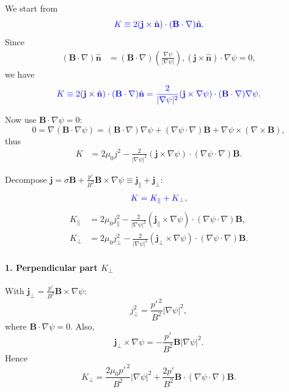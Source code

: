 \documentclass[10pt,a4paper]{article}
\numberwithin{equation}{section}
\begin{document}
We start from
\begin{equation}
\color{blue} K \equiv 2(\mathbf j\times \hat{\mathbf n})\cdot(\mathbf B\cdot\nabla)\hat{\mathbf n}.
\end{equation}
Since
\color{blue}\begin{align}
(\mathbf B\cdot\nabla)\hat{\mathbf n} &= (\mathbf B\cdot\nabla)\left(\frac{\nabla\psi}{|\nabla\psi|}\right),
(\mathbf j\times \hat{\mathbf n})\cdot \nabla\psi = 0,
\end{align}
\color{black}
we have
\begin{equation}
\color{blue}K
\equiv 2(\mathbf j\times \hat{\mathbf n})\cdot(\mathbf B\cdot\nabla)\hat{\mathbf n}
=
\frac{2}{|\nabla\psi|^2}
(\mathbf j\times\nabla\psi)\cdot(\mathbf B\cdot\nabla)\nabla\psi.
\end{equation}

Now use $\mathbf B\cdot\nabla\psi=0$:
\begin{equation}
0=\nabla(\mathbf B\cdot\nabla\psi) = (\mathbf B\cdot\nabla)\nabla\psi + (\nabla\psi\cdot\nabla)\mathbf B + \nabla\psi\times(\nabla\times\mathbf B),
\end{equation}
thus
\color{blue}\begin{align}
K &= 2\mu_0 j^2 - \frac{2}{|\nabla\psi|^2}(\mathbf j\times\nabla\psi)\cdot(\nabla\psi\cdot\nabla)\mathbf B.
\end{align}
\color{black}

Decompose $\mathbf j = \sigma\mathbf B + \frac{p'}{B^2}\mathbf B\times\nabla\psi \equiv \mathbf j_{\parallel}+\mathbf j_{\perp}$:
\begin{equation}
\color{blue}K = K_{\parallel}+K_{\perp},
\end{equation}
\color{blue}\begin{align}
K_{\parallel}
&=
2\mu_0 j_{\parallel}^2
-\frac{2}{|\nabla\psi|^2}
(\mathbf j_{\parallel}\times\nabla\psi)\cdot(\nabla\psi\cdot\nabla)\mathbf B,
\\
K_{\perp}
&=
2\mu_0 j_{\perp}^2
-\frac{2}{|\nabla\psi|^2}
(\mathbf j_{\perp}\times\nabla\psi)\cdot(\nabla\psi\cdot\nabla)\mathbf B.
\end{align}

\color{black}
\paragraph{1. Perpendicular part $K_{\perp}$}
With $\mathbf j_{\perp}=\frac{p'}{B^2}\mathbf B\times\nabla\psi$:
\begin{equation}
j_{\perp}^{2} = \frac{p'^{\,2}}{B^{2}}|\nabla\psi|^{2},
\end{equation}
where $\mathbf B\cdot\nabla\psi=0$. Also,
\begin{equation}
\mathbf j_{\perp}\times\nabla\psi = -\frac{p'}{B^{2}}\mathbf B|\nabla\psi|^{2}.
\end{equation}
Hence
\begin{equation}
K_{\perp} = \frac{2\mu_{0}p'^{\,2}}{B^{2}}|\nabla\psi|^{2} + \frac{2p'}{B^{2}}\mathbf B\cdot(\nabla\psi\cdot\nabla)\mathbf B.
\end{equation}
\end{document}
